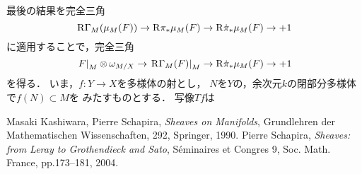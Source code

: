 \documentclass[uplatex,dvipdfmx,a4paper,10pt,draft]{jsarticle}
\theoremstyle{definition}
\numberwithin{equation}{section}
\newcommand{\RG}{\mathop{\mathrm{R}\hspace{-0pt}\Gamma}\nolimits}
\newcommand{\mhom}{\mathop{\mu\hspace{-0pt}hom}\nolimits}
\newcommand{\Rder}{\mathrm{R}}
\newcommand{\tens}[1][]{\mathbin{\otimes_{\raise1.5ex\hbox to-.1em{}{#1}}}}
\newcommand{\mres}[2][]{{\left.{#1}\right\rvert}_{#2}}
\theoremstyle{mystyle}
\begin{document}
最後の結果を完全三角
\[
    \RG_M(\mu_{M}(F))\to
    \Rder{\pi_{\ast}}\mu_{M}(F)\to
    \Rder{\dot{\pi}_{\ast}\mu_{M}(F)\to+1}
\]
に適用することで，完全三角
\[
    \mres[F]{M}\tens[]\omega_{M/X}\to
    \mres[\RG_M(F)]{M}\to
    \Rder{\dot{\pi}_{\ast}\mu_{M}(F)\to+1}
\]
を得る．
いま，\(f\colon Y\to X\)を多様体の射とし，
\(N\)を\(Y\)の，余次元\(k\)の閉部分多様体で\(f(N)\subset M\)を
みたすものとする．
写像\(Tf\)は


















\begin{thebibliography}{20} 
     Masaki Kashiwara, Pierre Schapira, 
      \textit{Sheaves on Manifolds}, 
      Grundlehren der Mathematischen Wissenschaften, 292, Springer, 1990.
     Pierre Schapira, 
      \textit{Sheaves: from Leray to Grothendieck and Sato}, 
      S\'eminaires et Congres 9, Soc. Math. France, pp.173--181, 2004.
\end{thebibliography}
  
\end{document}
